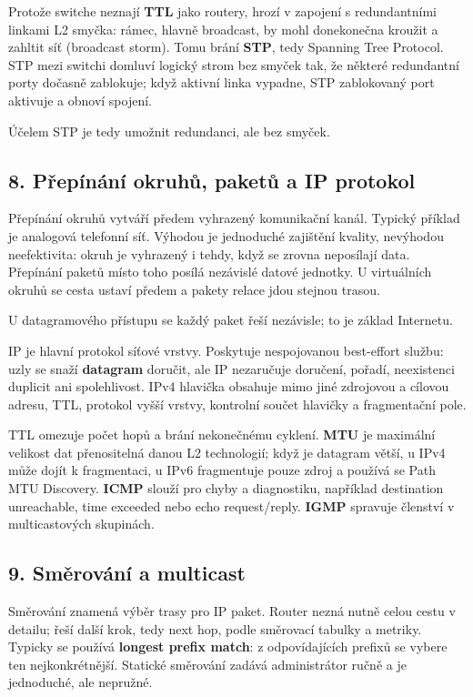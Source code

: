 \documentclass[11pt,a4paper]{article}
\begin{document}
Protože switche neznají \textbf{TTL} jako routery, hrozí v zapojení s redundantními linkami L2 smyčka: rámec, hlavně broadcast, by mohl donekonečna kroužit a zahltit síť (broadcast storm). Tomu brání \textbf{STP}, tedy Spanning Tree Protocol. STP mezi switchi domluví logický strom bez smyček tak, že některé redundantní porty dočasně zablokuje; když aktivní linka vypadne, STP zablokovaný port aktivuje a obnoví spojení.

Účelem STP je tedy umožnit redundanci, ale bez smyček.

\subsection*{8. Přepínání okruhů, paketů a IP protokol}

Přepínání okruhů vytváří předem vyhrazený komunikační kanál. Typický příklad je analogová telefonní síť. Výhodou je jednoduché zajištění kvality, nevýhodou neefektivita: okruh je vyhrazený i tehdy, když se zrovna neposílají data. Přepínání paketů místo toho posílá nezávislé datové jednotky. U virtuálních okruhů se cesta ustaví předem a pakety relace jdou stejnou trasou.

U datagramového přístupu se každý paket řeší nezávisle; to je základ Internetu.

IP je hlavní protokol síťové vrstvy. Poskytuje nespojovanou best-effort službu: uzly se snaží \textbf{datagram} doručit, ale IP nezaručuje doručení, pořadí, neexistenci duplicit ani spolehlivost. IPv4 hlavička obsahuje mimo jiné zdrojovou a cílovou adresu, TTL, protokol vyšší vrstvy, kontrolní součet hlavičky a fragmentační pole.

TTL omezuje počet hopů a brání nekonečnému cyklení. \textbf{MTU} je maximální velikost dat přenositelná danou L2 technologií; když je datagram větší, u IPv4 může dojít k fragmentaci, u IPv6 fragmentuje pouze zdroj a používá se Path MTU Discovery. \textbf{ICMP} slouží pro chyby a diagnostiku, například destination unreachable, time exceeded nebo echo request/reply. \textbf{IGMP} spravuje členství v multicastových skupinách.

\subsection*{9. Směrování a multicast}

Směrování znamená výběr trasy pro IP paket. Router nezná nutně celou cestu v detailu; řeší další krok, tedy next hop, podle směrovací tabulky a metriky. Typicky se používá \textbf{longest prefix match}: z odpovídajících prefixů se vybere ten nejkonkrétnější. Statické směrování zadává administrátor ručně a je jednoduché, ale nepružné.
\end{document}
